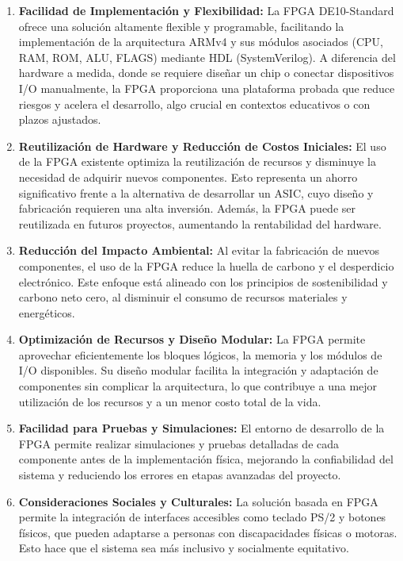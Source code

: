 \documentclass[conference]{IEEEtran}
\begin{document}
\begin{enumerate}
	\item \textbf{Facilidad de Implementación y Flexibilidad:} La FPGA DE10-Standard ofrece una solución altamente flexible y programable, facilitando la implementación de la arquitectura ARMv4 y sus módulos asociados (CPU, RAM, ROM, ALU, FLAGS) mediante HDL (SystemVerilog). A diferencia del hardware a medida, donde se requiere diseñar un chip o conectar dispositivos I/O manualmente, la FPGA proporciona una plataforma probada que reduce riesgos y acelera el desarrollo, algo crucial en contextos educativos o con plazos ajustados.
	
	\item \textbf{Reutilización de Hardware y Reducción de Costos Iniciales:} El uso de la FPGA existente optimiza la reutilización de recursos y disminuye la necesidad de adquirir nuevos componentes. Esto representa un ahorro significativo frente a la alternativa de desarrollar un ASIC, cuyo diseño y fabricación requieren una alta inversión. Además, la FPGA puede ser reutilizada en futuros proyectos, aumentando la rentabilidad del hardware.
	
	\item \textbf{Reducción del Impacto Ambiental:} Al evitar la fabricación de nuevos componentes, el uso de la FPGA reduce la huella de carbono y el desperdicio electrónico. Este enfoque está alineado con los principios de sostenibilidad y carbono neto cero, al disminuir el consumo de recursos materiales y energéticos.
	
	\item \textbf{Optimización de Recursos y Diseño Modular:} La FPGA permite aprovechar eficientemente los bloques lógicos, la memoria y los módulos de I/O disponibles. Su diseño modular facilita la integración y adaptación de componentes sin complicar la arquitectura, lo que contribuye a una mejor utilización de los recursos y a un menor costo total de la vida.
	
	\item \textbf{Facilidad para Pruebas y Simulaciones:} El entorno de desarrollo de la FPGA permite realizar simulaciones y pruebas detalladas de cada componente antes de la implementación física, mejorando la confiabilidad del sistema y reduciendo los errores en etapas avanzadas del proyecto.
	
	\item \textbf{Consideraciones Sociales y Culturales:} La solución basada en FPGA permite la integración de interfaces accesibles como teclado PS/2 y botones físicos, que pueden adaptarse a personas con discapacidades físicas o motoras. Esto hace que el sistema sea más inclusivo y socialmente equitativo.
\end{enumerate}
\end{document}
